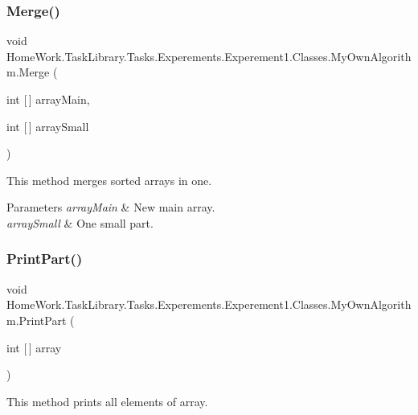 \subsubsection{\texorpdfstring{Merge()}{Merge()}}
{\footnotesize\ttfamily void Home\+Work.\+Task\+Library.\+Tasks.\+Experements.\+Experement1.\+Classes.\+My\+Own\+Algorithm.\+Merge (\begin{DoxyParamCaption}\item[{int \mbox{[}$\,$\mbox{]}}]{array\+Main,  }\item[{int \mbox{[}$\,$\mbox{]}}]{array\+Small }\end{DoxyParamCaption})\hspace{0.3cm}{\ttfamily [private]}}



This method merges sorted arrays in one. 


\begin{DoxyParams}{Parameters}
{\em array\+Main} & New main array.\\
\hline
{\em array\+Small} & One small part.\\
\hline
\end{DoxyParams}
\mbox{\label{class_home_work_1_1_task_library_1_1_tasks_1_1_experements_1_1_experement1_1_1_classes_1_1_my_own_algorithm_aa41c92e0b01a5e14ae9ad57fbd4f5bb8}} 
\subsubsection{\texorpdfstring{PrintPart()}{PrintPart()}}
{\footnotesize\ttfamily void Home\+Work.\+Task\+Library.\+Tasks.\+Experements.\+Experement1.\+Classes.\+My\+Own\+Algorithm.\+Print\+Part (\begin{DoxyParamCaption}\item[{int \mbox{[}$\,$\mbox{]}}]{array }\end{DoxyParamCaption})\hspace{0.3cm}{\ttfamily [private]}}



This method prints all elements of array. 


